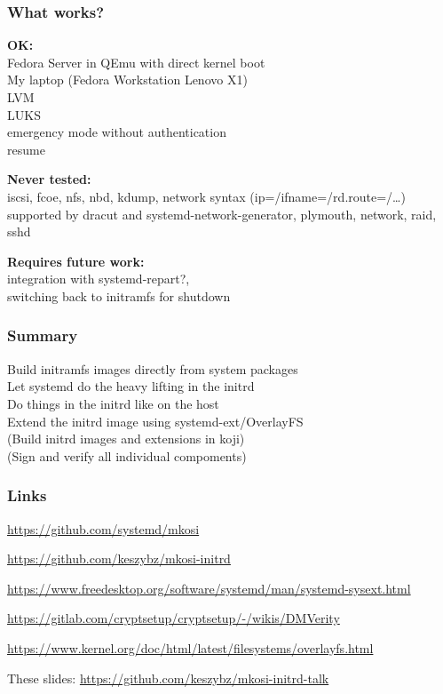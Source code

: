 \documentclass[]{beamer}
\begin{document}
\begin{frame}
  \frametitle{What works?}

  \textbf{OK:}\\
  Fedora Server in QEmu with direct kernel boot\\
  My laptop (Fedora Workstation Lenovo X1)\\
  LVM\\
  LUKS\\
  emergency mode without authentication\\
  resume

  \bigskip

  \textbf{Never tested:}\\
  iscsi,
  fcoe,
  nfs,
  nbd,
  kdump,
  network syntax (ip=/ifname=/rd.route=/…) supported by dracut and systemd-network-generator,
  plymouth,
  network,
  raid,
  sshd

  \bigskip

  \textbf{Requires future work:}\\
  integration with systemd-repart?,\\
  switching back to initramfs for shutdown
\end{frame}

\begin{frame}
  \frametitle{Summary}

  Build initramfs images directly from system packages\\
  Let systemd do the heavy lifting in the initrd\\
  Do things in the initrd like on the host\\
  Extend the initrd image using systemd-ext/OverlayFS\\
  (Build initrd images and extensions in koji)\\
  (Sign and verify all individual compoments)
\end{frame}

\begin{frame}[fragile]
  \frametitle{Links}

  \url{https://github.com/systemd/mkosi}

  \url{https://github.com/keszybz/mkosi-initrd}

  \url{https://www.freedesktop.org/software/systemd/man/systemd-sysext.html}

  {
    \small
    \url{https://gitlab.com/cryptsetup/cryptsetup/-/wikis/DMVerity}\\
    }

  \url{https://www.kernel.org/doc/html/latest/filesystems/overlayfs.html}

  These slides: \url{https://github.com/keszybz/mkosi-initrd-talk}

\end{frame}
\end{document}

